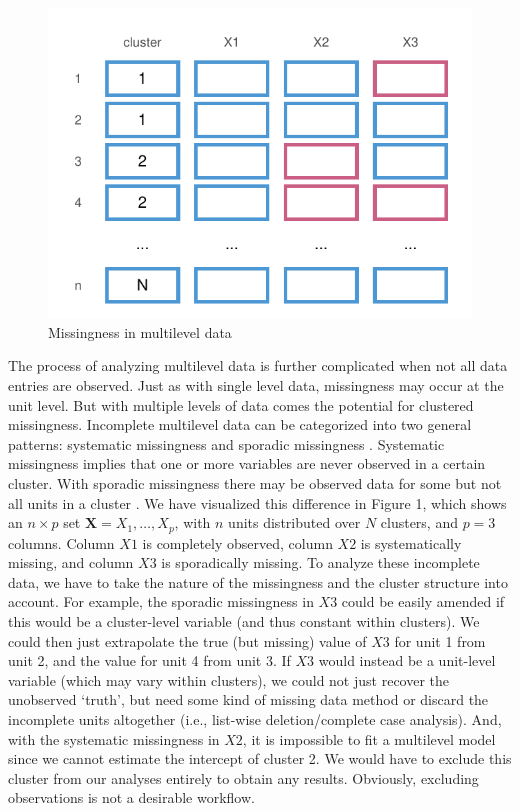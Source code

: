 \documentclass[
]{jss}
\begin{document}
\begin{CodeChunk}
\begin{figure}

{\centering \includegraphics{Manuscript_files/figure-latex/patterns-1} 

}

\caption[Missingness in multilevel data]{Missingness in multilevel data}\label{fig:patterns}
\end{figure}
\end{CodeChunk}

The process of analyzing multilevel data is further complicated when not
all data entries are observed. Just as with single level data,
missingness may occur at the unit level. But with multiple levels of
data comes the potential for clustered missingness. Incomplete
multilevel data can be categorized into two general patterns: systematic
missingness and sporadic missingness \citep{resc13}. Systematic
missingness implies that one or more variables are never observed in a
certain cluster. With sporadic missingness there may be observed data
for some but not all units in a cluster \citep{buur18, jola18}. We have
visualized this difference in Figure 1, which shows an \(n \times p\)
set \(\mathbf{X} = X_1, \dots, X_p\), with \(n\) units distributed over
\(N\) clusters, and \(p=3\) columns. Column \(X1\) is completely
observed, column \(X2\) is systematically missing, and column \(X3\) is
sporadically missing. To analyze these incomplete data, we have to take
the nature of the missingness and the cluster structure into account.
For example, the sporadic missingness in \(X3\) could be easily amended
if this would be a cluster-level variable (and thus constant within
clusters). We could then just extrapolate the true (but missing) value
of \(X3\) for unit 1 from unit 2, and the value for unit 4 from unit 3.
If \(X3\) would instead be a unit-level variable (which may vary within
clusters), we could not just recover the unobserved `truth', but need
some kind of missing data method or discard the incomplete units
altogether (i.e., list-wise deletion/complete case analysis). And, with
the systematic missingness in \(X2\), it is impossible to fit a
multilevel model since we cannot estimate the intercept of cluster 2. We
would have to exclude this cluster from our analyses entirely to obtain
any results. Obviously, excluding observations is not a desirable
workflow.
\end{document}
